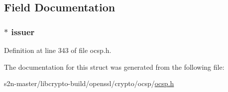 \subsection{Field Documentation}
\subsubsection[{\texorpdfstring{issuer}{issuer}}]{ $\ast$ issuer}\hypertarget{structocsp__service__locator__st_a45017edc554e7984544678696c7a2e75}{}\label{structocsp__service__locator__st_a45017edc554e7984544678696c7a2e75}


Definition at line 343 of file ocsp.\+h.



The documentation for this struct was generated from the following file\+:\begin{DoxyCompactItemize}
\item 
s2n-\/master/libcrypto-\/build/openssl/crypto/ocsp/\hyperlink{crypto_2ocsp_2ocsp_8h}{ocsp.\+h}\end{DoxyCompactItemize}
